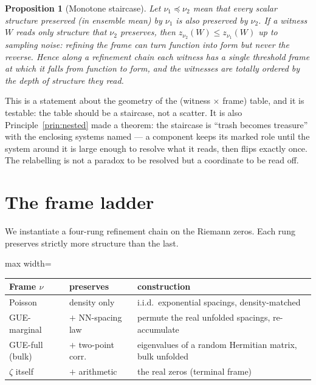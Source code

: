 \documentclass[11pt]{article}
\theoremstyle{definition}
\theoremstyle{plain}
\newtheorem{proposition}{Proposition}
\begin{document}
\begin{proposition}[Monotone staircase]\label{prop:stair}
Let $\nu_1 \preceq \nu_2$ mean that every scalar structure preserved (in ensemble mean) by $\nu_1$ is also preserved by $\nu_2$. If a witness $W$ reads only structure that $\nu_2$ preserves, then $z_{\nu_2}(W)\le z_{\nu_1}(W)$ up to sampling noise: refining the frame can turn function into form but never the reverse. Hence along a refinement chain each witness has a single threshold frame at which it falls from function to form, and the witnesses are totally ordered by the depth of structure they read.
\end{proposition}

This is a statement about the geometry of the (witness $\times$ frame) table, and it is testable: the table should be a staircase, not a scatter. It is also Principle~\ref{prin:nested} made a theorem: the staircase is ``trash becomes treasure'' with the enclosing systems named --- a component keeps its marked role until the system around it is large enough to resolve what it reads, then flips exactly once. The relabelling is not a paradox to be resolved but a coordinate to be read off.

\section{The frame ladder}\label{sec:ladder}

We instantiate a four-rung refinement chain on the Riemann zeros. Each rung preserves strictly more structure than the last.

\begin{center}
\renewcommand{\arraystretch}{1.25}
\begin{adjustbox}{max width=\linewidth}\begin{tabular}{@{}llp{6.6cm}@{}}
\toprule
Frame $\nu$ & preserves & construction \\
\midrule
Poisson            & density only        & i.i.d.\ exponential spacings, density-matched \\
GUE-marginal       & $+$ NN-spacing law  & permute the real unfolded spacings, re-accumulate \\
GUE-full (bulk)    & $+$ two-point corr. & eigenvalues of a random Hermitian matrix, bulk unfolded \\
$\zeta$ itself     & $+$ arithmetic      & the real zeros (terminal frame) \\
\bottomrule
\end{tabular}\end{adjustbox}
\end{center}
\end{document}
